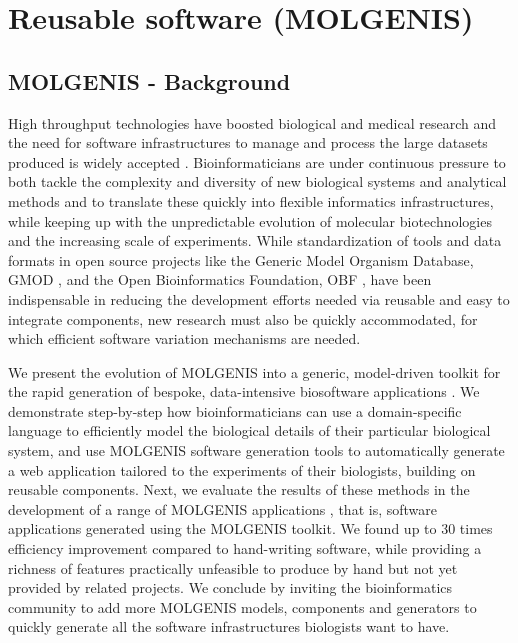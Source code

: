 \documentclass[8pt, twoside, a5paper]{report}
\begin{document}
\newpage

\section{Reusable software (MOLGENIS)}
\subsection{MOLGENIS - Background}
High throughput technologies have boosted biological and medical research and the need for software infrastructures to 
manage and process the large datasets produced is widely accepted \cite{Swertz:2007,Stein:2008,Thorisson:2009}. 
Bioinformaticians are under continuous pressure to both tackle the complexity and diversity of new biological systems 
and analytical methods and to translate these quickly into flexible informatics infrastructures, while keeping up 
with the unpredictable evolution of molecular biotechnologies and the increasing scale of experiments. While 
standardization of tools and data formats in open source projects like the Generic Model Organism Database, GMOD 
\cite{OConnor:2008}, and the Open Bioinformatics Foundation, OBF \cite{OBF:2010:Online}, have been 
indispensable in reducing the development efforts needed via reusable and easy to integrate components, new research 
must also be quickly accommodated, for which efficient software variation mechanisms are needed.

We present the evolution of MOLGENIS into a generic, model-driven toolkit for the rapid generation of bespoke, data-intensive 
biosoftware applications \cite{MOLGENIS:2010:Online}. We demonstrate step-by-step how bioinformaticians can use a domain-specific 
language to efficiently model the biological details of their particular biological system, and use MOLGENIS software 
generation tools to automatically generate a web application tailored to the experiments of their biologists, building 
on reusable components. Next, we evaluate the results of these methods in the development of a range of MOLGENIS applications 
\cite{Swertz:2004, Swertz:2010a, Thorisson:2009, Leu:2010, Li:2009, Smedley:2008}, that is, software applications generated 
using the MOLGENIS toolkit. We found up to 30 times efficiency improvement compared to hand-writing software, while 
providing a richness of features practically unfeasible to produce by hand but not yet provided by related projects. We 
conclude by inviting the bioinformatics community to add more MOLGENIS models, components and generators to quickly 
generate all the software infrastructures biologists want to have.
\end{document}
